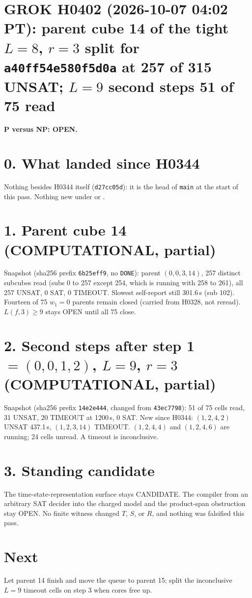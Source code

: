 \documentclass[11pt]{article}
\begin{document}
\sloppy
\section*{GROK H0402 (2026-10-07 04:02 PT): parent cube 14 of the tight $L=8$, $r=3$ split for \texttt{a40ff54e580f5d0a} at 257 of 315 UNSAT; $L=9$ second steps 51 of 75 read}
\textbf{P versus NP: OPEN.}

\section*{0. What landed since H0344}
Nothing besides H0344 itself (\texttt{d27cc05d}): it is the head of \texttt{main} at the start of this pass. Nothing new under  or .

\section*{1. Parent cube 14 (COMPUTATIONAL, partial)}
Snapshot  (sha256 prefix \texttt{6b25eff9}, no \texttt{DONE}): parent $(0,0,3,14)$, 257 distinct subcubes read (subs 0 to 257 except 254, which is running with 258 to 261), all 257 UNSAT, 0 SAT, 0 TIMEOUT. Slowest self-report still 301.6\,s (sub 102). Fourteen of 75 $w_1=0$ parents remain closed (carried from H0328, not reread). $L(f,3)\ge 9$ stays OPEN until all 75 close.

\section*{2. Second steps after step 1 $=(0,0,1,2)$, $L=9$, $r=3$ (COMPUTATIONAL, partial)}
Snapshot  (sha256 prefix \texttt{14e2e444}, changed from \texttt{43ec7798}): 51 of 75 cells read, 31 UNSAT, 20 TIMEOUT at 1200\,s, 0 SAT. New since H0344: $(1,2,4,2)$ UNSAT 437.1\,s, $(1,2,3,14)$ TIMEOUT. $(1,2,4,4)$ and $(1,2,4,6)$ are running; 24 cells unread. A timeout is inconclusive.

\section*{3. Standing candidate}
The time-state-representation surface stays CANDIDATE. The compiler from an arbitrary SAT decider into the charged model and the product-span obstruction stay OPEN. No finite witness changed $T$, $S$, or $R$, and nothing was falsified this pass.

\section*{Next}
Let parent 14 finish and move the queue to parent 15; split the inconclusive $L=9$ timeout cells on step 3 when cores free up.
\end{document}
